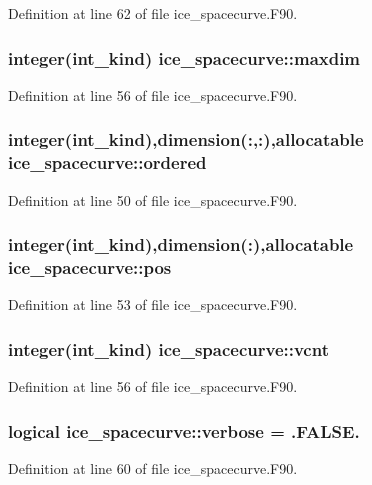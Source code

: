 Definition at line 62 of file ice\_\-spacecurve.F90.\hypertarget{namespaceice__spacecurve_aee0a00b4e25e4f5c770a300d2093feb7}{
\subsubsection[{maxdim}]{\setlength{\rightskip}{0pt plus 5cm}integer(int\_\-kind) {\bf ice\_\-spacecurve::maxdim}}}
\label{namespaceice__spacecurve_aee0a00b4e25e4f5c770a300d2093feb7}


Definition at line 56 of file ice\_\-spacecurve.F90.\hypertarget{namespaceice__spacecurve_a1338f6fba84ddb72ad229795cc040231}{
\subsubsection[{ordered}]{\setlength{\rightskip}{0pt plus 5cm}integer(int\_\-kind),dimension(:,:),allocatable {\bf ice\_\-spacecurve::ordered}}}
\label{namespaceice__spacecurve_a1338f6fba84ddb72ad229795cc040231}


Definition at line 50 of file ice\_\-spacecurve.F90.\hypertarget{namespaceice__spacecurve_a440379dc8df1be7a6903b0df94d181b1}{
\subsubsection[{pos}]{\setlength{\rightskip}{0pt plus 5cm}integer(int\_\-kind),dimension(:),allocatable {\bf ice\_\-spacecurve::pos}}}
\label{namespaceice__spacecurve_a440379dc8df1be7a6903b0df94d181b1}


Definition at line 53 of file ice\_\-spacecurve.F90.\hypertarget{namespaceice__spacecurve_ad07b7ca9c91db52f0cee81fac7c71c5a}{
\subsubsection[{vcnt}]{\setlength{\rightskip}{0pt plus 5cm}integer(int\_\-kind) {\bf ice\_\-spacecurve::vcnt}}}
\label{namespaceice__spacecurve_ad07b7ca9c91db52f0cee81fac7c71c5a}


Definition at line 56 of file ice\_\-spacecurve.F90.\hypertarget{namespaceice__spacecurve_a486a46d8f8d78fea131f7fe3d429b0dc}{
\subsubsection[{verbose}]{\setlength{\rightskip}{0pt plus 5cm}logical {\bf ice\_\-spacecurve::verbose} = .FALSE.}}
\label{namespaceice__spacecurve_a486a46d8f8d78fea131f7fe3d429b0dc}


Definition at line 60 of file ice\_\-spacecurve.F90.